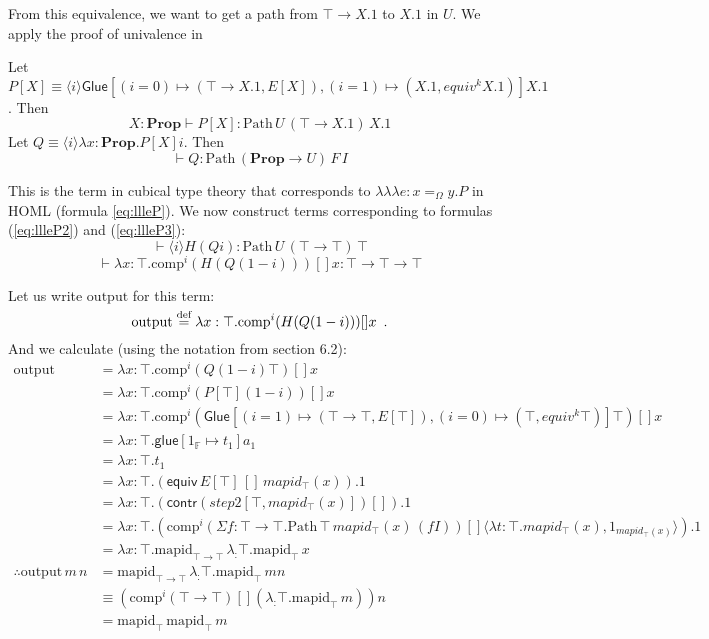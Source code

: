 \documentclass[a4paper,UKenglish]{lipics-v2016}
\newcommand*{\eqdef}{\mathrel{\smash{\stackrel{\text{def}}{=}}}}
\newcommand*{\triplelambda}{\ensuremath{\lambda \!\! \lambda \!\! \lambda}}
\newcommand{\Path}[3]{\ensuremath{\mathrm{Path} \, {#1} \, {#2} \, {#3}}}
\newcommand{\Prop}{\mathbf{Prop}}
\newcommand{\outputt}{\mathrm{output}}
\newcommand{\mapid}[2]{\mathrm{mapid}_{#1} \, {#2}}
\newcommand{\comp}{\mathrm{comp}}
\theoremstyle{plain}
\theoremstyle{definition}
\begin{document}
From this equivalence, we want to get a path from $\top \rightarrow X.1$ to $X.1$ in $U$.  We apply the proof of univalence in \cite{cchm:cubical}

Let $P[X] \equiv \langle i \rangle \mathsf{Glue} [(i = 0) \mapsto (\top \rightarrow X.1, E[X]), (i = 1) \mapsto (X.1, equiv^k X.1)] X.1$.  Then
$$ X : \Prop \vdash P[X] : \Path{U}{(\top \rightarrow X.1)}{X.1} $$
Let $Q \equiv \langle i \rangle \lambda x : \Prop. P[X] i$.  Then
$$ \vdash Q : \Path{(\Prop \rightarrow U)}{F}{I} $$

This is the term in cubical type theory that corresponds to $\triplelambda e : x =_\Omega y.P$ in HOML (formula \ref{eq:llleP}).  We now construct
terms corresponding to formulas (\ref{eq:llleP2}) and (\ref{eq:llleP3}):
\[ \vdash \langle i \rangle H (Q i) : \Path{U}{(\top \rightarrow \top)}{\top} \]
\[ \vdash \lambda x : \top. \comp^i (H (Q (1 - i))) [] x : \top \rightarrow \top \rightarrow \top \]

Let us write $\outputt$ for this term:
\[ \outputt \eqdef \lambda x : \top. \comp^i (H (Q (1 - i))) [] x \enspace . \]
And we calculate (using the notation from \cite{cchm:cubical} section 6.2):
\begin{align*}
\outputt
& = \lambda x : \top. \comp^i (Q (1 - i) \top) [] x \\
& = \lambda x : \top. \comp^i (P[\top] (1 - i)) [] x \\
& = \lambda x : \top. \comp^i (\mathsf{Glue}[(i = 1) \mapsto (\top \rightarrow \top, E[\top]), (i = 0) \mapsto (\top, equiv^k \top)] \top) [] x \\
& = \lambda x : \top. \mathsf{glue} [ 1_\mathbb{F} \mapsto t_1 ] a_1 \\
& = \lambda x : \top. t_1 \\
& = \lambda x : \top. (\mathsf{equiv} \, E[\top] \, [] \, mapid_\top(x)).1 \\
& = \lambda x : \top. (\mathsf{contr} (step2[\top, mapid_\top(x)]) []).1 \\
& = \lambda x : \top. (\comp^i (\Sigma f : \top \rightarrow \top. \Path{\top}{mapid_\top(x)}{(fI)}) [] \langle \lambda t : \top. mapid_\top(x), 1_{mapid_\top(x)} \rangle).1 \\
& = \lambda x : \top. \mapid{\top \rightarrow \top}{\lambda _ : \top. \mapid{\top}{x}} \\
\therefore \outputt \, m \, n & = \mapid{\top \rightarrow \top}{\lambda _ : \top. \mapid{\top}{m}} n \\
& \equiv (\comp^i (\top \rightarrow \top) [] (\lambda _ : \top. \mapid{\top}{m})) n \\
& = \mapid{\top}{\mapid{\top}{m}}
\end{align*}
\end{document}
